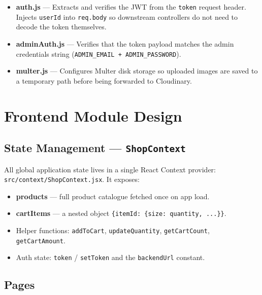 \documentclass[12pt,a4paper]{report}
\begin{document}
\begin{itemize}[leftmargin=*]
  \item \textbf{auth.js} — Extracts and verifies the JWT from the \texttt{token} request header.
        Injects \texttt{userId} into \texttt{req.body} so downstream controllers do not need to
        decode the token themselves.
  \item \textbf{adminAuth.js} — Verifies that the token payload matches the admin credentials
        string (\texttt{ADMIN\_EMAIL + ADMIN\_PASSWORD}).
  \item \textbf{multer.js} — Configures Multer disk storage so uploaded images are saved to a
        temporary path before being forwarded to Cloudinary.
\end{itemize}

\section{Frontend Module Design}

\subsection{State Management — \texttt{ShopContext}}

All global application state lives in a single React Context provider:
\texttt{src/context/ShopContext.jsx}.
It exposes:

\begin{itemize}[leftmargin=*]
  \item \textbf{products} — full product catalogue fetched once on app load.
  \item \textbf{cartItems} — a nested object \texttt{\{itemId: \{size: quantity, ...\}\}}.
  \item Helper functions: \texttt{addToCart}, \texttt{updateQuantity}, \texttt{getCartCount},
        \texttt{getCartAmount}.
  \item Auth state: \texttt{token} / \texttt{setToken} and the \texttt{backendUrl} constant.
\end{itemize}

\subsection{Pages}
\end{document}
